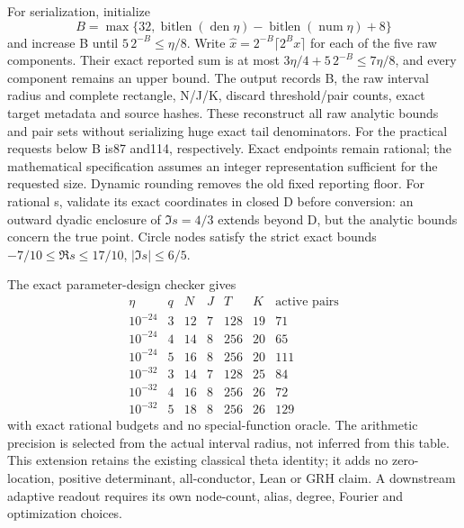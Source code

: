 For serialization, initialize
\[
 B=\max\{32,\operatorname{bitlen}(\operatorname{den}\eta)
             -\operatorname{bitlen}(\operatorname{num}\eta)+8\}
\]
and increase B until $5\,2^{-B}\le\eta/8$.
Write $\widehat x=2^{-B}\lceil2^Bx\rceil$ for each of the five raw
components. Their exact reported sum is at most
$3\eta/4+5\,2^{-B}\le7\eta/8$, and every component remains an upper
bound. The output records B, the raw interval radius and complete rectangle,
N/J/K, discard threshold/pair counts, exact target metadata and source hashes.
These reconstruct all raw analytic bounds and pair sets without serializing
huge exact tail denominators. For the practical requests below B is87
and114, respectively. Exact endpoints remain rational; the mathematical
specification assumes an integer representation sufficient for the requested
size. Dynamic rounding removes the old fixed reporting floor. For rational s, validate its exact coordinates in closed D before
conversion: an outward dyadic enclosure of $\Im s=4/3$ extends beyond D,
but the analytic bounds concern the true point. Circle nodes satisfy the
strict exact bounds $-7/10\le\Re s\le17/10$, $|\Im s|\le6/5$.

The exact parameter-design checker gives
\[
\begin{array}{c|c|rrrr|r}
\eta&q&N&J&T&K&\text{active pairs}\\\hline
10^{-24}&3&12&7&128&19&71\\
10^{-24}&4&14&8&256&20&65\\
10^{-24}&5&16&8&256&20&111\\
10^{-32}&3&14&7&128&25&84\\
10^{-32}&4&16&8&256&26&72\\
10^{-32}&5&18&8&256&26&129
\end{array}
\]
with exact rational budgets and no special-function oracle.
The arithmetic precision is selected from the actual interval radius,
not inferred from this table. This extension retains the existing
classical theta identity; it adds no zero-location, positive determinant,
all-conductor, Lean or GRH claim. A downstream adaptive readout requires
its own node-count, alias, degree, Fourier and optimization choices.
